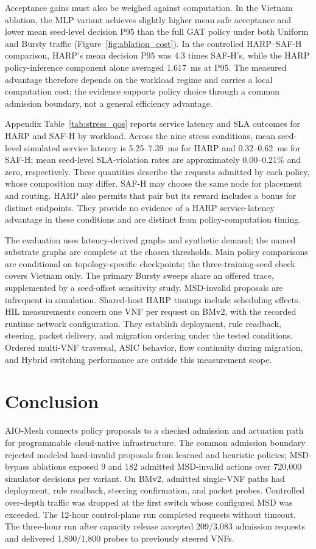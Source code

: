 \documentclass[final,5p]{elsarticle}
\newcommand{\rev}[1]{\textcolor{revisiongreen}{#1}}
\let\newrev\rev
\begin{document}
\newrev{Acceptance gains must also be weighed against computation. In the Vietnam ablation, the MLP variant achieves slightly higher mean safe acceptance and lower mean seed-level decision P95 than the full GAT policy under both Uniform and Bursty traffic (Figure~\ref{fig:ablation_cost}). In the controlled HARP--SAF-H comparison, HARP's mean decision P95 was 4.3 times SAF-H's, while the HARP policy-inference component alone averaged 1.617~ms at P95. The measured advantage therefore depends on the workload regime and carries a local computation cost; the evidence supports policy choice through a common admission boundary, not a general efficiency advantage.}

\newrev{Appendix Table~\ref{tab:stress_qos} reports service latency and SLA outcomes for HARP and SAF-H by workload. Across the nine stress conditions, mean seed-level simulated service latency is 5.25--7.39~ms for HARP and 0.32--0.62~ms for SAF-H; mean seed-level SLA-violation rates are approximately 0.00--0.21\% and zero, respectively. These quantities describe the requests admitted by each policy, whose composition may differ. SAF-H may choose the same node for placement and routing. HARP also permits that pair but its reward includes a bonus for distinct endpoints. They provide no evidence of a HARP service-latency advantage in these conditions and are distinct from policy-computation timing.}

\newrev{The evaluation uses latency-derived graphs and synthetic demand; the named substrate graphs are complete at the chosen thresholds. Main policy comparisons are conditional on topology-specific checkpoints; the three-training-seed check covers Vietnam only. The primary Bursty sweeps share an offered trace, supplemented by a seed-offset sensitivity study. MSD-invalid proposals are infrequent in simulation. Shared-host HARP timings include scheduling effects. HIL measurements concern one VNF per request on BMv2, with the recorded runtime network configuration. They establish deployment, rule readback, steering, packet delivery, and migration ordering under the tested conditions. Ordered multi-VNF traversal, ASIC behavior, flow continuity during migration, and Hybrid switching performance are outside this measurement scope.}

\section{Conclusion}
\label{sec:conclusion}
\newrev{AIO-Mesh connects policy proposals to a checked admission and actuation path for programmable cloud-native infrastructure. The common admission boundary rejected modeled hard-invalid proposals from learned and heuristic policies; MSD-bypass ablations exposed 9 and 182 admitted MSD-invalid actions over 720,000 simulator decisions per variant. On BMv2, admitted single-VNF paths had deployment, rule readback, steering confirmation, and packet probes. Controlled over-depth traffic was dropped at the first switch whose configured MSD was exceeded. The 12-hour control-plane run completed \HILRequests{} requests without timeout. The three-hour run after capacity release accepted 209/3,083 admission requests and delivered 1,800/1,800 probes to previously steered VNFs.}
\end{document}
